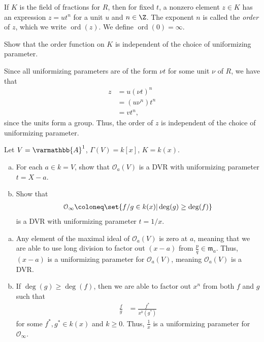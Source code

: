 \documentclass[10pt]{mypackage}
\renewcommand*{\mathbb}[1]{\varmathbb{#1}}
\newcommand{\A}{\mathbb{A}}
\begin{document}
If $K$ is the field of fractions for $R$, then for fixed $t$, a nonzero element $z\in K$ has an expression $z = ut^{n}$ for a unit $u$ and $n\in\Z$. The exponent $n$ is called the \textit{order} of $z$, which we write $\operatorname{ord}\left( z \right)$. We define $\operatorname{ord}\left( 0 \right) = \infty$.
\begin{exercise}[Exercise 2.23]
Show that the order function on $K$ is independent of the choice of uniformizing parameter.
\end{exercise}
\begin{solution}
  Since all uniformizing parameters are of the form $\nu t$ for some unit $\nu$ of $R$, we have that 
  \begin{align*}
    z &= u\left( \nu t \right)^{n}\\
      &= \left( u\nu^{n} \right) t^{n}\\
      &= vt^{n},
  \end{align*}
  since the units form a group. Thus, the order of $z$ is independent of the choice of uniformizing parameter.
\end{solution}
\begin{exercise}
  Let $V = \A^1$, $\Gamma(V) = k\left[ x \right]$, $K = k(x)$.
  \begin{enumerate}[(a)]
    \item For each $a\in k = V$, show that $\mathcal{O}_a(V)$ is a DVR with uniformizing parameter $t = X-a$.
    \item Show that 
      \begin{align*}
        \mathcal{O}_{\infty}\coloneq \set{f/g\in k(x) | \deg(g)\geq \deg(f)}
      \end{align*}
      is a DVR with uniformizing parameter $t = 1/x$.
  \end{enumerate}
\end{exercise}
\begin{solution}\hfill
  \begin{enumerate}[(a)]
    \item Any element of the maximal ideal of $\mathcal{O}_a\left( V \right)$ is zero at $a$, meaning that we are able to use long division to factor out $\left( x-a \right)$ from $\frac{p}{q}\in \mathfrak{m}_a$. Thus, $\left( x-a \right)$ is a uniformizing parameter for $\mathcal{O}_a(V)$, meaning $\mathcal{O}_a(V)$ is a DVR.
    \item If $\deg\left( g \right)\geq \deg\left( f \right)$, then we are able to factor out $x^{n}$ from both $f$ and $g$ such that
      \begin{align*}
        \frac{f}{g} &= \frac{f^{\ast}}{x^{k}\left( g^{\ast} \right)}
      \end{align*}
      for some $f^{\ast},g^{\ast}\in k\left( x \right)$ and $k\geq 0$. Thus, $\frac{1}{x}$ is a uniformizing parameter for $\mathcal{O}_{\infty}$.
  \end{enumerate}
\end{solution}
\end{document}
